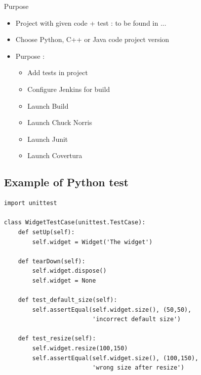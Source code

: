 \documentclass[9pt]{beamer}
\begin{document}
\begin{frame}{Purpose} %
\begin{itemize}
\item Project with given code + test : to be found in ...
\item Choose Python, C++ or Java code project version
\item Purpose :
\begin{itemize}
\item Add tests in project
\item Configure Jenkins for build
\item Launch Build
\item Launch Chuck Norris
\item Launch Junit
\item Launch Covertura
\end{itemize}
\end{itemize}
\end{frame}

\subsection{Example of Python test}
\begin{frame}[fragile]{\subsecname} %
\begin{verbatim}
import unittest

class WidgetTestCase(unittest.TestCase):
    def setUp(self):
        self.widget = Widget('The widget')

    def tearDown(self):
        self.widget.dispose()
        self.widget = None

    def test_default_size(self):
        self.assertEqual(self.widget.size(), (50,50),
                         'incorrect default size')

    def test_resize(self):
        self.widget.resize(100,150)
        self.assertEqual(self.widget.size(), (100,150),
                         'wrong size after resize')

\end{verbatim}
\end{frame}
\end{document}
